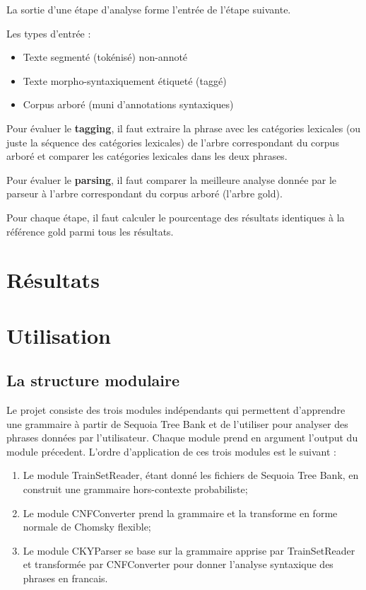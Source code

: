 \documentclass[12pt]{article}
\begin{document}
La sortie d'une \'etape d'analyse forme l'entr\'ee de l'\'etape suivante.

Les types d'entr\'ee :
\begin{itemize}
\item Texte segment\'e (tok\'enis\'e) non-annot\'e
\item Texte morpho-syntaxiquement \'etiquet\'e (tagg\'e)
\item Corpus arbor\'e (muni d'annotations syntaxiques)
\end{itemize}

Pour \'evaluer le \textbf{tagging}, il faut extraire la phrase avec les cat\'egories
lexicales (ou juste la s\'equence des cat\'egories lexicales) de l'arbre
correspondant du corpus arbor\'e et comparer les cat\'egories lexicales dans les
deux phrases.\par

Pour \'evaluer le \textbf{parsing}, il faut comparer la meilleure analyse donn\'ee
par le parseur \`a l'arbre correspondant du corpus arbor\'e (l'arbre gold).

Pour chaque \'etape, il faut calculer le pourcentage des r\'esultats identiques \`a
la r\'ef\'erence gold parmi tous les r\'esultats.


\section{R\'esultats}

\section{Utilisation}
\subsection{La structure modulaire}
Le projet consiste des trois modules ind\'ependants qui permettent d'apprendre une
grammaire \`a partir de Sequoia Tree Bank \cite{Sequoia} et de l'utiliser pour
analyser des phrases donn\'ees par l'utilisateur. Chaque module prend en
argument l'output du module pr\'ecedent. L'ordre d'application de ces trois
modules est le suivant :
\begin{enumerate}
  \item Le module TrainSetReader, \'etant donn\'e les fichiers de Sequoia Tree Bank,
  en construit une grammaire hors-contexte probabiliste;
  \item Le module CNFConverter prend la grammaire et la transforme en forme
  normale de Chomsky flexible;
  \item Le module CKYParser se base sur la grammaire apprise par TrainSetReader
  et transform\'ee par CNFConverter pour donner l'analyse syntaxique des phrases
  en francais.
\end{enumerate}
\end{document}
